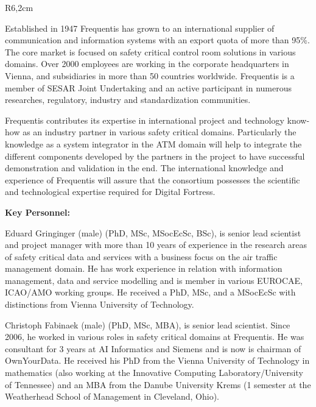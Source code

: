 \documentclass[a4paper,11pt]{article}
\begin{document}

\begin{wrapfigure}{R}{6,2cm}
\vspace{-3cm}
\hfill {}
\vspace{-1cm}
\end{wrapfigure}
\vspace{10pt}

Established in 1947 Frequentis has grown to an international supplier of communication and information systems with an export quota of more than 95\%. The core market is focused on safety critical control room solutions in various domains. Over 2000 employees are working in the corporate headquarters in Vienna, and subsidiaries in more than 50 countries worldwide. Frequentis is a member of SESAR Joint Undertaking and an active participant in numerous researches, regulatory, industry and standardization communities.

Frequentis contributes its expertise in international project and technology know-how as an industry partner in various safety critical domains. Particularly the knowledge as a system integrator in the ATM domain will help to integrate the different components developed by the partners in the project to have successful demonstration and validation in the end. The international knowledge and experience of Frequentis will assure that the consortium possesses the scientific and technological expertise required for Digital Fortress.

\vspace{10pt}

\textbf{Key Personnel:}

Eduard Gringinger (male) (PhD, MSc, MSocEcSc, BSc), is senior lead scientist and project manager with more than 10 years of experience in the research areas of safety critical data and services with a business focus on the air traffic management domain. He has work experience in relation with information management, data and service modelling and is member in various EUROCAE, ICAO/AMO working groups. He received a PhD, MSc, and a MSocEcSc with distinctions from Vienna University of Technology.

Christoph Fabinaek (male) (PhD, MSc, MBA), is senior lead scientist. Since 2006, he worked in various roles in safety critical domains at Frequentis. He was consultant for 3 years at AI Informatics and Siemens and is now is chairman of OwnYourData. He received his PhD from the Vienna University of Technology in mathematics (also working at the Innovative Computing Laboratory/University of Tennessee) and an MBA from the Danube University Krems (1 semester at the Weatherhead School of Management in Cleveland, Ohio).
\end{document}

